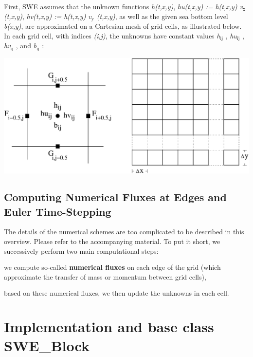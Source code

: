 First, S\-W\-E assumes that the unknown functions {\itshape h(t,x,y)}, {\itshape hu(t,x,y) \-:= h(t,x,y) v$_{\mbox{x}}$ (t,x,y)}, {\itshape hv(t,x,y) \-:= h(t,x,y) v$_{\mbox{y}}$ (t,x,y)}, as well as the given sea bottom level {\itshape b(x,y)}, are approximated on a Cartesian mesh of grid cells, as illustrated below. In each grid cell, with indices {\itshape (i,j)}, the unknowns have constant values {\itshape h$_{\mbox{ij}}$ }, {\itshape hu$_{\mbox{ij}}$ }, {\itshape hv$_{\mbox{ij}}$ }, and {\itshape b$_{\mbox{ij}}$ }\-:

 
\begin{DoxyImageNoCaption}
  \mbox{\includegraphics{grid_unknowns}}
\end{DoxyImageNoCaption}
\hypertarget{index_fluxes}{}\subsection{Computing Numerical Fluxes at Edges and Euler Time-\/\-Stepping}\label{index_fluxes}
The details of the numerical schemes are too complicated to be described in this overview. Please refer to the accompanying material. To put it short, we successively perform two main computational steps\-:
\begin{DoxyItemize}
\item we compute so-\/called {\bfseries numerical fluxes} on each edge of the grid (which approximate the transfer of mass or momentum between grid cells),
\item based on these numerical fluxes, we then update the unknowns in each cell.
\end{DoxyItemize}\hypertarget{index_impl}{}\section{Implementation and base class S\-W\-E\-\_\-\-Block}\label{index_impl}
